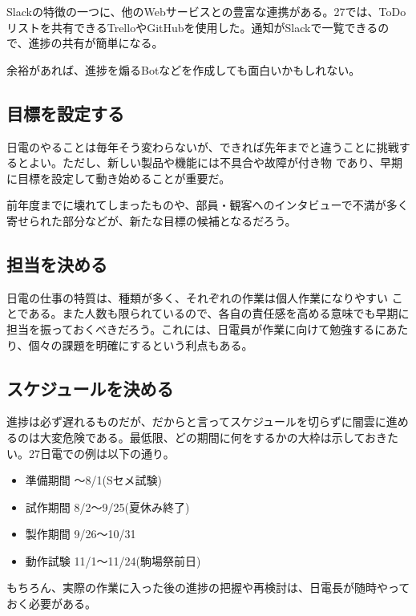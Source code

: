 \documentclass[letterpaper,10pt,dvipdfmx]{sphinxmanual}
\begin{document}
Slackの特徴の一つに、他のWebサービスとの豊富な連携がある。27では、ToDoリストを共有できるTrelloやGitHubを使用した。通知がSlackで一覧できるので、進捗の共有が簡単になる。

余裕があれば、進捗を煽るBotなどを作成しても面白いかもしれない。


\subsection{目標を設定する}
\label{\detokenize{management:}}\label{\detokenize{management:id5}}
日電のやることは毎年そう変わらないが、できれば先年までと違うことに挑戦するとよい。ただし、新しい製品や機能には不具合や故障が付き物 であり、早期に目標を設定して動き始めることが重要だ。

前年度までに壊れてしまったものや、部員・観客へのインタビューで不満が多く寄せられた部分などが、新たな目標の候補となるだろう。


\subsection{担当を決める}
\label{\detokenize{management:}}\label{\detokenize{management:id6}}
日電の仕事の特質は、種類が多く、それぞれの作業は個人作業になりやすい ことである。また人数も限られているので、各自の責任感を高める意味でも早期に担当を振っておくべきだろう。これには、日電員が作業に向けて勉強するにあたり、個々の課題を明確にするという利点もある。


\subsection{スケジュールを決める}
\label{\detokenize{management:}}\label{\detokenize{management:id7}}
進捗は必ず遅れるものだが、だからと言ってスケジュールを切らずに闇雲に進めるのは大変危険である。最低限、どの期間に何をするかの大枠は示しておきたい。27日電での例は以下の通り。
\begin{itemize}
\item {} 
準備期間 〜8/1(Sセメ試験)

\item {} 
試作期間 8/2〜9/25(夏休み終了)

\item {} 
製作期間 9/26〜10/31

\item {} 
動作試験 11/1〜11/24(駒場祭前日)

\end{itemize}

もちろん、実際の作業に入った後の進捗の把握や再検討は、日電長が随時やっておく必要がある。
\end{document}
